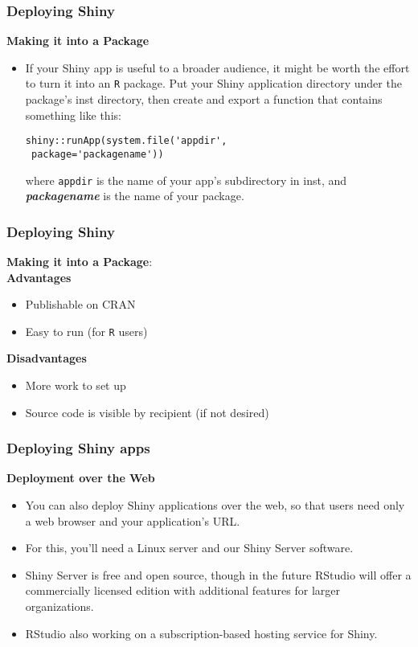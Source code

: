 \documentclass{beamer}
\begin{document}
\begin{frame}[fragile]
\frametitle{Deploying Shiny}
\textbf{Making it into a Package}
\begin{itemize}
\item If your Shiny app is useful to a broader audience, it might be worth the effort to turn it into an \texttt{R} package. Put your Shiny application directory under the package’s inst directory, then create and export a function that contains something like this:
\begin{framed}
\begin{verbatim}
shiny::runApp(system.file('appdir', 
 package='packagename'))
\end{verbatim}
\end{framed}
where \texttt{appdir} is the name of your app’s subdirectory in inst, and \textbf{\emph{packagename}} is the name of your package.
\end{itemize}
\end{frame}

\begin{frame}
\frametitle{Deploying Shiny}
\textbf{Making it into a Package}:\\ \bigskip
\textbf{Advantages} \begin{itemize}
\item Publishable on CRAN
\item Easy to run (for \texttt{R} users)
\end{itemize} \textbf{Disadvantages} \begin{itemize}
\item More work to set up
\item Source code is visible by recipient (if not desired)
\end{itemize}
\end{frame}

\begin{frame}
\frametitle{Deploying Shiny apps}
\Large
\textbf{Deployment over the Web}
\begin{itemize}
\item You can also deploy Shiny applications over the web, so that users need only a web browser and your application’s URL.
\item For this, you’ll need a Linux server and our Shiny Server software. 
\item Shiny Server is free and open source, though in the future RStudio will offer a commercially licensed edition with additional features for larger organizations.
\item RStudio also working on a subscription-based hosting service for Shiny. 
\end{itemize}
\end{frame}
\end{document}
